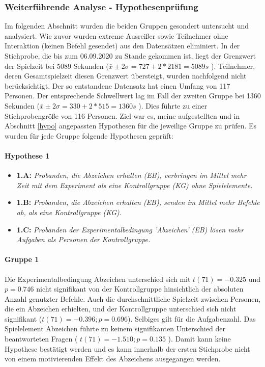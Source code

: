 \subsubsection{Weiterführende Analyse - Hypothesenprüfung}


Im folgenden Abschnitt wurden die beiden Gruppen gesondert untersucht und analysiert. Wie zuvor wurden extreme Ausreißer sowie Teilnehmer ohne Interaktion (keinen Befehl gesendet) aus den Datensätzen eliminiert. In der Stichprobe, die bis zum 06.09.2020 zu Stande gekommen ist, liegt der Grenzwert der Spielzeit bei 5089 Sekunden ($\bar{x}\pm 2\sigma = 727 + 2*2181 = 5089 s$ ). Teilnehmer, deren Gesamtspielzeit diesen Grenzwert übersteigt, wurden nachfolgend nicht berücksichtigt. Der so entstandene Datensatz hat einen Umfang von 117 Personen. Der entsprechende Schwellwert lag im Fall der zweiten Gruppe bei 1360 Sekunden ($\bar{x}\pm 2\sigma = 330 + 2*515 = 1360 s$ ). Dies führte zu einer Stichprobengröße von 116 Personen. Ziel war es, meine aufgestellten und in Abschnitt \ref{hypo} angepassten Hypothesen für die jeweilige Gruppe zu prüfen. Es wurden für jede Gruppe folgende Hypothesen geprüft:

\paragraph{Hypothese 1}
\begin{itemize}
    \item \textbf{1.A:} \textit{Probanden, die Abzeichen erhalten (EB), verbringen im Mittel mehr Zeit mit dem Experiment als eine Kontrollgruppe (KG) ohne Spielelemente.}
    \item \textbf{1.B:} \textit{Probanden, die Abzeichen erhalten (EB), senden im Mittel mehr Befehle ab, als eine Kontrollgruppe (KG).}
    \item \textbf{1.C:} \textit{Probanden der Experimentalbedingung 'Abzeichen' (EB) lösen mehr Aufgaben als Personen der Kontrollgruppe.} 
\end{itemize}

\paragraph{Gruppe 1}
Die Experimentalbedingung Abzeichen unterschied sich mit $ t(71)=-0.325 $ und $p=0.746$ nicht signifikant von der Kontrollgruppe hinsichtlich der absoluten Anzahl genutzter Befehle. Auch die durchschnittliche Spielzeit zwischen Personen, die ein Abzeichen erhielten, und der Kontrollgruppe unterschied sich nicht signifikant ($t(71)=-0.396; p=0.696$). Selbiges gilt für die Aufgabenzahl. Das Spielelement Abzeichen führte zu keinem signifikanten Unterschied der beantworteten Fragen ( $ t(71)=-1.510; p=0.135 $ ). Damit kann keine Hypothese bestätigt werden und es kann innerhalb der ersten Stichprobe nicht von einem motivierenden Effekt des Abzeichens ausgegangen werden.

